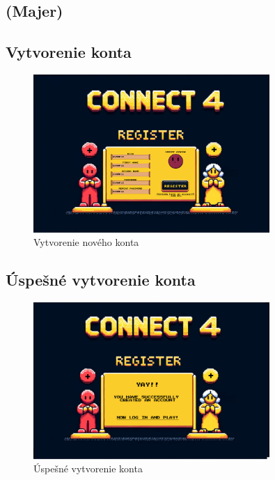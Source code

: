 \documentclass[a4paper, 11pt, onecolumn]{article}
\begin{document}
\subsection{(Majer)}
\subsection*{Vytvorenie konta}
\begin{figure}[H]
  \centering
  \includegraphics[width=0.8\textwidth]{Register.png}
  \caption{Vytvorenie nového konta}
  \label{fig:register}
\end{figure}

\subsection*{Úspešné vytvorenie konta}
\begin{figure}[H]
  \centering
  \includegraphics[width=0.8\textwidth]{RegisterDone.png}
  \caption{Úspešné vytvorenie konta}
  \label{fig:register_done}
\end{figure}
\end{document}
